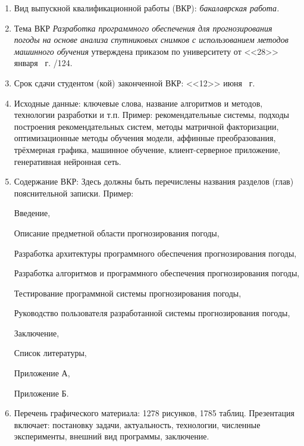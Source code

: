 \documentclass[14pt]{extarticle}
\begin{document}
\begin{enumerate}[label=\arabic*., leftmargin=0pt, labelsep=0.25em, itemindent=13pt, itemsep=6pt] %
	\small\linespread{1}\selectfont
	\item Вид выпускной квалификационной работы (ВКР): \textit {бакалаврская работа.}
	\item Тема ВКР \textit{Разработка программного обеспечения для прогнозирования погоды на основе анализа спутниковых снимков с использованием методов машинного обучения} 
	утверждена приказом по университету от <<28>> января \the\year \ г. /124.
	\item Срок сдачи студентом (кой) законченной ВКР: <<12>> июня \the\year \ г.
	\item Исходные данные: ключевые слова, название алгоритмов и методов, технологии разработки и т.п. Пример:  рекомендательные системы, подходы построения рекомендательных систем, методы матричной факторизации, оптимизационные методы обучения модели, аффинные преобразования, трёхмерная графика, машинное обучение, клиент-серверное приложение, генеративная нейронная сеть.
	\item Содержание ВКР:
	Здесь должны быть перечислены названия разделов (глав) пояснительной записки. Пример: \par
	\hspace{13pt}Введение,\par
	\hspace{13pt}Описание предметной области прогнозирования погоды,\par
	\hspace{13pt}Разработка архитектуры программного обеспечения прогнозирования погоды,\par
	\hspace{13pt}Разработка алгоритмов и программного обеспечения прогнозирования погоды,\par
	\hspace{13pt}Тестирование программной системы прогнозирования погоды,\par
	\hspace{13pt}Руководство пользователя разработанной системы прогнозирования погоды,\par
	\hspace{13pt}Заключение,\par
	\hspace{13pt}Список литературы,\par
	\hspace{13pt}Приложение А,\par
	\hspace{13pt}Приложение Б.\par
	\newpage
	\item Перечень графического материала: 1278 рисунков, 1785 таблиц. Презентация включает: постановку задачи, актуальность, технологии, численные эксперименты, внешний вид программы, заключение.
\end{enumerate}
\end{document}
